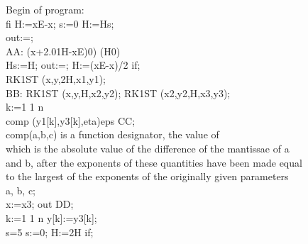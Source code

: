 \documentclass[a4paper,11pt]{article}
\begin{document}
\begin{flushleft}
{Begin of program:\\
\vspace{1.0em}
\hspace{1.0cm} fi   H:=xE-x; s:=0   H:=Hs;\\
\hspace{1.0cm}out:=;\\
\vspace{1.0em}
AA:  (x+2.01\mtim{}H-xE)\mgt{}0) \mleqv{} (H\mgt{}0) \\
\hspace{1.0cm} Hs:=H; out:=; H:=(xE-x)/2  if;\\
\hspace{1.0cm}RK1ST (x,y,2\mtim{}H,x1,y1);\\
\vspace{1.0em}
BB: RK1ST (x,y,H,x2,y2); RK1ST (x2,y2,H,x3,y3);\\
\hspace{1.0cm} k:=1  1  n \\
\hspace{1.0cm}\hspace{1.0cm} comp (y1[k],y3[k],eta)\mgt{}eps   CC;\\
\hspace{1.0cm} comp(a,b,c) is a function designator, the value of\\
\hspace{1.0cm}which is the absolute value of the difference of the mantissae of a\\
\hspace{1.0cm}and b, after the exponents of these quantities have been made equal\\
\hspace{1.0cm}to the largest of the exponents of the originally given parameters\\
\hspace{1.0cm}a, b, c;\\
\hspace{1.0cm}x:=x3;  out   DD;\\
\hspace{1.0cm} k:=1  1  n  y[k]:=y3[k];\\
\hspace{1.0cm} s=5   s:=0; H:=2\mtim{}H  if;\\
}
\end{flushleft}
\end{document}
